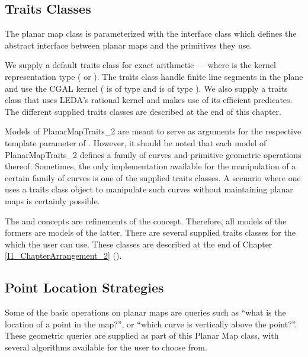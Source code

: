 \subsection*{Traits Classes}
The planar map class is parameterized with the interface class
 which defines the abstract interface
between planar maps and the primitives they use.

We supply a default traits class for exact arithmetic ---
 where  is the kernel
representation type ( or ).  
The traits class handle finite line segments in the plane
and use the CGAL kernel ( is of type 
 and  is of type
).
We also supply a traits class that uses LEDA's rational kernel and makes use
of its efficient predicates. The different supplied traits classes are described
at the end of this chapter.

Models of PlanarMapTraits\_2 are meant to serve as arguments for the respective
template parameter of . However, it should
be noted that
each model of PlanarMapTraits\_2 defines a family of curves and
primitive geometric operations thereof. Sometimes, the only
implementation available for the manipulation of a certain family of
curves is one of the supplied traits classes. A scenario where one
uses a traits class object to manipulate such curves without
maintaining planar maps is certainly possible.

The  and  
concepts are refinements of the  concept.
Therefore, all models of the formers are models of the latter. 
There are several supplied traits classes for the  which the user can use. 
These classes are described at the end of Chapter \ref{I1_ChapterArrangement_2}
().

\subsection*{Point Location Strategies}
Some of the basic operations on planar maps are queries such as ``what
is the location of a point in the map?'', or ``which curve is
vertically above the point?''. These geometric queries are supplied as
part of this Planar Map class, with several algorithms available for
the user to choose from.

